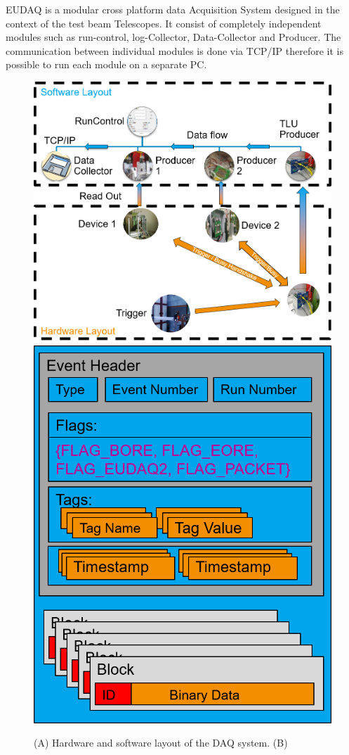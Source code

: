 
EUDAQ is a modular cross platform data Acquisition System designed in the context of the \eudet test beam Telescopes. 
It consist of completely independent modules such as run-control, log-Collector, Data-Collector and Producer. 
The communication between individual modules is done via TCP/IP therefore it is possible to run each module on a separate PC. 


\begin{figure}[tb]
	\center
	\includegraphics[width=.55\textwidth]{figures/EUDAQ.png}
	\includegraphics[width=.38\textwidth]{figures/rawdataevent.png}
	\caption[DAQ_System]{(A) Hardware and software layout of the DAQ system. (B) \rawdataevent}
	\label{fig:todo}
\end{figure}

% 	



